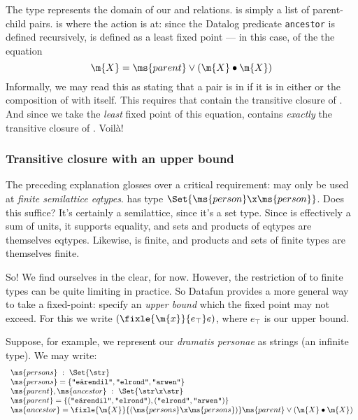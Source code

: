 The type  represents the domain of our  and 
relations.  is simply a list of parent-child pairs.  is
where the action is at: since the Datalog predicate \texttt{ancestor} is defined
recursively,  is defined as a least fixed point --- in this case,
of the the equation
\begin{equation*}
  \m{X} = \ms{parent} \vee (\m{X} \bullet \m{X})
\end{equation*}
Informally, we may read this as stating that a pair is in  if it is in
either  or the composition of  with itself. This requires that
 contain the transitive closure of . And since we take the
\emph{least} fixed point of this equation,  contains \emph{exactly}
the transitive closure of . Voil\`a!


\subsubsection{Transitive closure with an upper bound}

The preceding explanation glosses over a critical requirement:  may only
be used at \emph{finite semilattice eqtypes}.  has type
$\Set{\ms{person} \x \ms{person}}$. Does this suffice? It's certainly a
semilattice, since it's a set type. Since  is effectively a sum of
units, it supports equality, and sets and products of eqtypes are themselves
eqtypes. Likewise,  is finite, and products and sets of finite types
are themselves finite.

So! We find ourselves in the clear, for now. However, the restriction of
 to finite types can be quite limiting in practice. So Datafun provides
a more general way to take a fixed-point: specify an \emph{upper bound} which
the fixed point may not exceed. For this we write $(\fixle{\m{x}}{e_\top} e)$,
where $e_\top$ is our upper bound.

Suppose, for example, we represent our \textit{dramatis personae} as strings (an
infinite type). We may write:
\[\begin{array}{l}
\ms{persons} ~:~ \Set{\str}\\
\ms{persons} = \{\texttt{"e\"arendil"}, \texttt{"elrond"}, \texttt{"arwen"}\}\\
\ms{parent}, \ms{ancestor} ~:~ \Set{\str \x \str}\\
\ms{parent} = \{(\texttt{"e\"arendil"}, \texttt{"elrond"}),
(\texttt{"elrond"}, \texttt{"arwen"})\}\\
\ms{ancestor} = \fixle{\m{X}}{(\ms{persons} \x \ms{persons})}
\ms{parent} \vee (\m{X} \bullet \m{X})
\end{array}\]


